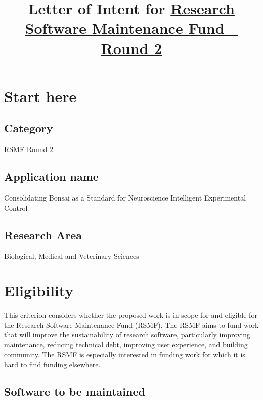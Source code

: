 \documentclass[12pt]{article}
\title{Letter of Intent for \href{https://www.software.ac.uk/research-software-maintenance-fund/round-2}{Research Software Maintenance Fund -- Round 2}}
\author{}
\newenvironment{instruction}{%
    \begin{tcolorbox}[breakable,colback=red!5,colframe=red,title=Instruction]%
	}{%
    	\end{tcolorbox}%
	}
\begin{document}
\maketitle
\tableofcontents

\section{Start here}

\subsection{Category}

RSMF Round 2

\subsection{Application name}

Consolidating Bonsai as a Standard for Neuroscience Intelligent Experimental Control

\subsection{Research Area}

Biological, Medical and Veterinary Sciences

\pagebreak

\section{Eligibility}

\begin{instruction}

    This criterion considers whether the proposed work is in scope for and
    eligible for the Research Software Maintenance Fund (RSMF). The RSMF aims
    to fund work that will improve the sustainability of research software,
    particularly improving maintenance, reducing technical debt, improving user
    experience, and building community. The RSMF is especially interested in
    funding work for which it is hard to find funding elsewhere.

\end{instruction}

\subsection{Software to be maintained}
\end{document}

